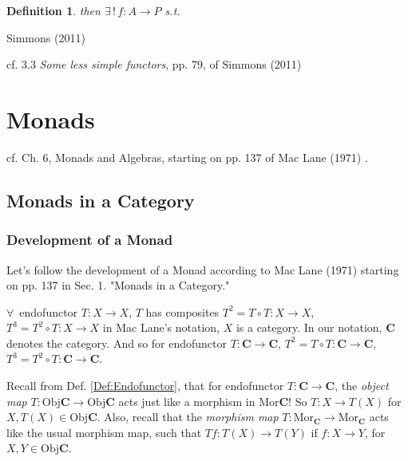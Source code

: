 \documentclass[10pt]{amsart}
\newtheorem{definition}{Definition}
\begin{document}
\begin{multicols*}{2}
\begin{definition}
	then $\exists \, ! \, f: A \to P$ s.t. 
	
	
	
\end{definition}

Simmons (2011) \cite{Simm2011}

cf. 3.3 \emph{Some less simple functors}, pp. 79, of Simmons (2011) \cite{Simm2011}

\section{Monads}

cf. Ch. 6, Monads and Algebras, starting on pp. 137 of Mac Lane (1971) \cite{MacL1978}.

\subsection{Monads in a Category}

\subsubsection{Development of a Monad}

Let's follow the development of a Monad according to Mac Lane (1971) \cite{MacL1978} starting on pp. 137 in Sec. 1. "Monads in a Category."

$\forall \, $ endofunctor $T: X \to X$, $T$ has composites $T^2 = T\circ T : X \to X$, $T^3 = T^2 \circ T:X \to X$ in Mac Lane's notation, $X$ is a category. In our notation, $\mathbf{C}$ denotes the category. And so for endofunctor $T: \mathbf{C} \to \mathbf{C}$, $T^2 = T\circ T: \mathbf{C} \to \mathbf{C}$, $T^3 = T^2 \circ T: \mathbf{C} \to \mathbf{C}$. 

Recall from Def. \ref{Def:Endofunctor}, that for endofunctor $T:\mathbf{C} \to \mathbf{C}$, the \emph{object map} $T: \text{Obj}{\mathbf{C}} \to \text{Obj}{\mathbf{C}}$ acts just like a morphism in $\text{Mor}{\mathbf{C}}$! So $T: X \to T(X)$ for $X, T(X) \in \text{Obj}{\mathbf{C}}$. Also, recall that the \emph{morphism map} $T: \text{Mor}_{\mathbf{C}} \to \text{Mor}_{\mathbf{C}}$ acts like the usual morphism map, such that $Tf : T(X) \to T(Y)$ if $f:X\to Y$, for $X,Y \in \text{Obj}{\mathbf{C}}$. \\


\end{multicols*}
\end{document}
